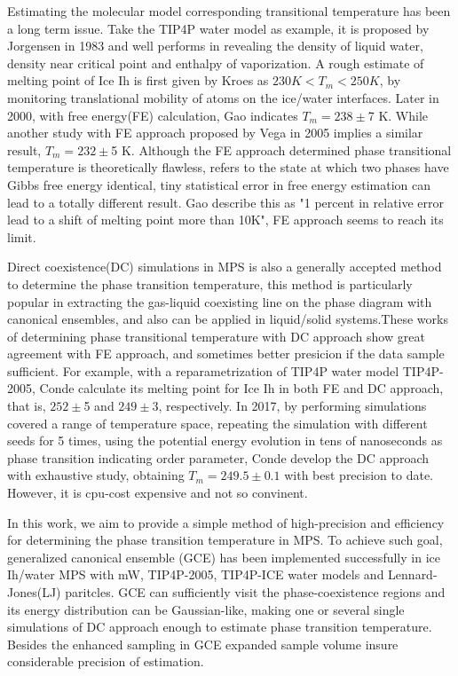 \documentclass[aps,prl,twocolumn,superscriptaddress]{revtex4-1}
\begin{document}
Estimating the molecular model corresponding transitional temperature has been a long term issue. Take the TIP4P water model as example, it is proposed by Jorgensen in 1983\cite{Jorgensen1983} and well performs in revealing the density of liquid water, density near critical point and enthalpy of vaporization\cite{Vega2011}.  A rough estimate of melting point of Ice Ih is first given by Kroes\cite{Kroes1992} as  $230K<T_m<250K$, by monitoring translational mobility of atoms on the ice/water interfaces. Later in 2000, with free energy(FE) calculation, Gao indicates $T_m=238 \pm$7 K\cite{Gao2000}.  While another study with FE approach proposed by Vega in 2005 implies a similar result, $T_m=232 \pm$5 K\cite{Vega2005}.  Although the FE approach determined phase transitional temperature is theoretically flawless, refers to the state at which two phases have Gibbs free energy identical, tiny statistical error in free energy estimation can lead to a totally different result. Gao describe this as "1 percent in relative error lead to a shift of melting point more than 10K"\cite{Gao2000}, FE approach seems to reach its limit. 

Direct coexistence(DC) simulations in MPS is also a generally accepted method to determine the phase transition temperature, this method is particularly popular in extracting the gas-liquid coexisting line on the phase diagram with canonical ensembles\cite{Ghoufi2008b,Vega2007,Alejandre1995,Ladd1977Triple}, and also can be applied in liquid/solid systems\cite{Conde2017,Bryk2002,Conde2013}.These works of determining phase transitional temperature with DC approach show great agreement with FE approach, and sometimes better presicion if the data sample sufficient. For example, with a reparametrization of TIP4P water model TIP4P-2005\cite{Abascal2005a}, Conde calculate its melting point for Ice Ih in both FE and DC approach, that is, $252\pm$5 and $249\pm$3, respectively\cite{Conde2013}. In 2017, by performing simulations covered a range of temperature space, repeating the simulation with different seeds for 5 times, using the potential energy evolution in tens of nanoseconds as phase transition indicating order parameter, Conde develop the DC approach with exhaustive study, obtaining $T_m=249.5\pm0.1$ with best precision to date. However, it is cpu-cost expensive and not so convinent.

In this work, we aim to provide a simple method of high-precision and efficiency for determining the phase transition temperature in MPS. To achieve such goal, generalized canonical ensemble (GCE)\cite{Xu2012,Xu2015} has been implemented successfully in ice Ih/water MPS with mW, TIP4P-2005, TIP4P-ICE water models and Lennard-Jones(LJ) paritcles. GCE can sufficiently visit the phase-coexistence regions and its energy distribution can be Gaussian-like, making one or several single simulations of DC approach enough to estimate phase transition temperature. Besides the enhanced sampling in GCE expanded sample volume insure considerable precision of estimation.
\end{document}
